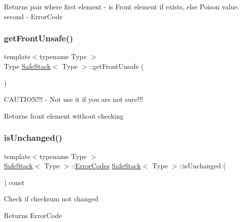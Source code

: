 \begin{DoxyReturn}{Returns}
pair where first element -\/ is Front element if exists, else Poison value. second -\/ Error\+Code 
\end{DoxyReturn}
\mbox{\label{classSafeStack_ad3ebe85bc788378690144800418e761d}} 
\subsubsection{\texorpdfstring{get\+Front\+Unsafe()}{getFrontUnsafe()}}
{\footnotesize\ttfamily template$<$typename Type $>$ \\
Type \hyperlink{classSafeStack}{Safe\+Stack}$<$ Type $>$\+::get\+Front\+Unsafe (\begin{DoxyParamCaption}{ }\end{DoxyParamCaption})}

C\+A\+U\+T\+I\+O\+N!!! -\/ Not use it if you are not sure!!! \begin{DoxyReturn}{Returns}
front element without checking 
\end{DoxyReturn}
\mbox{\label{classSafeStack_a6ba7568bccbbd336aa7f6ee6102cd411}} 
\subsubsection{\texorpdfstring{is\+Unchanged()}{isUnchanged()}}
{\footnotesize\ttfamily template$<$typename Type $>$ \\
\hyperlink{classSafeStack}{Safe\+Stack}$<$ Type $>$\+::\hyperlink{classSafeStack_a3a6ee072918bd0a2c09fa0ea12c1ab64}{Error\+Codes} \hyperlink{classSafeStack}{Safe\+Stack}$<$ Type $>$\+::is\+Unchanged (\begin{DoxyParamCaption}{ }\end{DoxyParamCaption}) const}

Check if checksum not changed \begin{DoxyReturn}{Returns}
Error\+Code 
\end{DoxyReturn}
\mbox{\label{classSafeStack_a7add18e30f467b9b08233feeed6544df}} 
